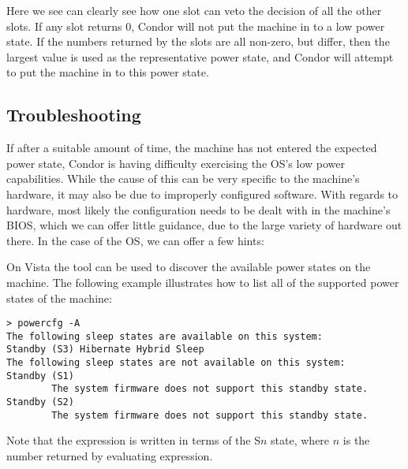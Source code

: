 Here we see can clearly see how one slot can veto the decision of all the 
other slots.  If any slot returns $0$, Condor will not put the machine in 
to a low power state.  If the numbers returned by the slots are all non-zero, 
but differ, then the largest value is used as the representative power 
state, and Condor will attempt to put the machine in to this power state.


\subsection{Troubleshooting}

If after a suitable amount of time, the machine has not entered the expected 
power state, Condor is having difficulty exercising the OS's low power 
capabilities.  While the cause of this can be very specific to the machine's
hardware, it may also be due to improperly configured software.  
With regards to hardware, most likely the configuration needs to be dealt with
in the machine's BIOS, which we can offer little guidance, due to the 
large variety of hardware out there.  In the case of the OS, we can offer
a few hints:

On Vista the  tool can be used to discover the available 
power states on the machine.  The following example illustrates how to
list all of the supported power states of the machine:

\begin{verbatim}
> powercfg -A
The following sleep states are available on this system: 
Standby (S3) Hibernate Hybrid Sleep
The following sleep states are not available on this system:
Standby (S1)
        The system firmware does not support this standby state.
Standby (S2)
        The system firmware does not support this standby state.
\end{verbatim}

Note that the  expression is written in terms of the 
S$n$ state, where $n$ is the number returned by evaluating expression.

